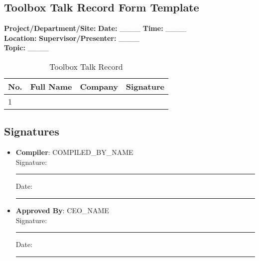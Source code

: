\documentclass[11pt]{article}
\newcommand{\location}{}
\newcommand{\compilerName}{{{COMPILED_BY_NAME}}}
\begin{document}
\subsection*{Toolbox Talk Record Form Template}

\textbf{Project/Department/Site:} \location \textbf{Date:} \_\_\_\_ \textbf{Time:} \_\_\_\_ \\
\textbf{Location:} \location \textbf{Supervisor/Presenter:} \_\_\_\_ \\
\textbf{Topic:} \_\_\_\_

\begin{table}[h]
    \centering
    \begin{tabular}{p{1cm}p{3cm}p{3cm}p{3cm}}
        \toprule
        \textbf{No.} & \textbf{Full Name} & \textbf{Company} & \textbf{Signature} \\
        \midrule
        1 & & & \\
        \bottomrule
    \end{tabular}
    \caption{Toolbox Talk Record}
\end{table}

\subsection*{Signatures}
\begin{itemize}
  \item \textbf{Compiler}: \compilerName \\
    Signature: \rule{5cm}{0.4pt} \quad Date: \rule{3cm}{0.4pt}
  \item \textbf{Approved By}: {{CEO_NAME}} \\
    Signature: \rule{5cm}{0.4pt} \quad Date: \rule{3cm}{0.4pt}
\end{itemize}
\end{document}
